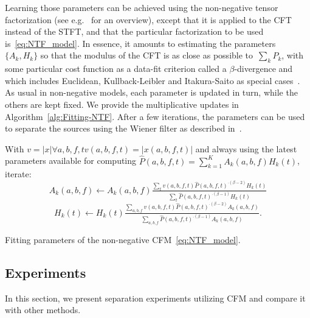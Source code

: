 Learning those parameters can be achieved using the non-negative tensor factorization (see e.g.~\cite{cichoki09,ozerov12,smaragdis14} for an overview), except that it is applied to the CFT instead of the \acs{STFT}, and that the particular factorization to be used is~\eqref{eq:NTF_model}.
In essence, it amounts to estimating the parameters~$\{ A_{k},H_{k}\}$ so that the modulus of the CFT is as close as possible to~$\sum_{k}P_{k}$, with some particular cost function as a data-fit criterion called a $\beta$-divergence and which includes Euclidean, Kullback-Leibler and Itakura-Saito as special cases~\cite{fitzgerald08a}. 
As usual in non-negative models, each parameter is updated in turn, while the others are kept fixed.
We provide the multiplicative updates in Algorithm~\ref{alg:Fitting-NTF}.
After a few iterations, the parameters can be used to separate the sources using the Wiener filter as described in~\cite{liutkus15}.

\begin{algorithm}
With $v=\left|x\right| \forall a,b,f,t v(a,b,f,t) = |x(a,b,f,t)|$ and always using the latest
parameters available for computing
 $\hat{P}\left(a,b,f,t\right)=\sum\limits_{k=1}^{K}A_{k}\left(a,b,f\right)H_{k}\left(t\right)$,
iterate:
\[
A_{k}\left(a,b,f\right)\leftarrow A_{k}\left(a,b,f\right)\tfrac{\sum_{t}v\left(a,b,f,t\right)\hat{P}\left(a,b,f,t\right)^{\cdot\left(\beta-2\right)}H_{k}\left(t\right)}{\sum_{t}\hat{P}\left(a,b,f,t\right)^{\cdot\left(\beta-1\right)}H_{k}\left(t\right)}
\]
\[
H_{k}\left(t\right)\leftarrow H_{k}\left(t\right)\tfrac{\sum_{a,b,f}v\left(a,b,f,t\right)\hat{P}\left(a,b,f,t\right)^{\cdot\left(\beta-2\right)}A_{k}\left(a,b,f\right)}{\sum_{a,b,f}\hat{P}\left(a,b,f,t\right)^{\cdot\left(\beta-1\right)}A_{k}\left(a,b,f\right)}.
\]
\caption{Fitting parameters of the non-negative CFM~\eqref{eq:NTF_model}.\label{alg:Fitting-NTF}}
\end{algorithm}

\subsection{Experiments}
\label{sec:experiment}

In this section, we present separation experiments utilizing CFM and compare it with other methods.

